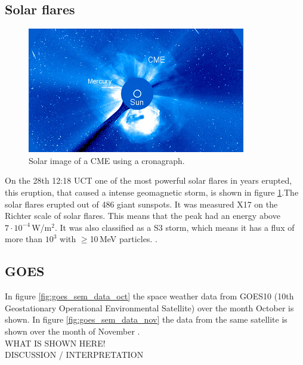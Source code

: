 \subsection{Solar flares}
\begin{figure}
\includegraphics[width=.5\textwidth]{figures/SW_CME.jpg}

\caption{Solar image of a CME using a cronagraph\cite{spaceweather}.}
\label{fig:SW:CME}
\end{figure} 

On the 28th 12:18 UCT one of the most powerful solar flares in years erupted, this eruption, that caused a intense geomagnetic storm, is shown in figure \ref{fig:SW:CME}.The solar flares erupted out of 486 giant sunspots. It was measured X17  on the Richter scale of solar flares. This means that the peak had an energy above $7 \cdot 10^{-4}$\,W/m$^2$. It was also classified as a S3 storm, which means it has a flux of more than $10^3$ with $\geq$10\,MeV particles.  \cite{spaceweather}.\\


\subsection{GOES}
In figure \ref{fig:goes_sem_data_oct} the space weather data from GOES10 (10th Geostationary Operational Environmental Satellite) over the month October is shown. In figure \ref{fig:goes_sem_data_nov} the data from the same satellite is shown over the month of November \cite{ngdc-noaa}. \\

WHAT IS SHOWN HERE!\\

DISCUSSION / INTERPRETATION


